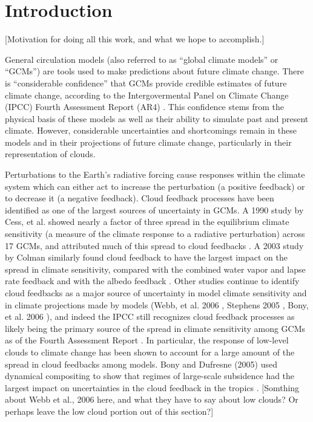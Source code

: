 

%

\chapter{Introduction}
[Motivation for doing all this work, and what we hope to accomplish.]

General circulation models (also referred to as ``global climate models'' or ``GCMs'') are tools used to make predictions about future climate change. There is ``considerable confidence'' that GCMs provide credible estimates of future climate change, according to the Intergovermental Panel on Climate Change (IPCC) Fourth Assessment Report (AR4) \cite{ar4_ch8}. This confidence stems from the physical basis of these models as well as their ability to simulate past and present climate. However, considerable uncertainties and shortcomings remain in these models and in their projections of future climate change, particularly in their representation of clouds.

Perturbations to the Earth's radiative forcing cause responses within the climate system which can either act to increase the perturbation (a positive feedback) or to decrease it (a negative feedback). Cloud feedback processes have been identified as one of the largest sources of uncertainty in GCMs. A 1990 study by Cess, et al. showed nearly a factor of three spread in the equilibrium climate sensitivity (a measure of the climate response to a radiative perturbation) across 17 GCMs, and attributed much of this spread to cloud feedbacks \cite{cess_et_al_1990}. A 2003 study by Colman similarly found cloud feedback to have the largest impact on the spread in climate sensitivity, compared with the combined water vapor and lapse rate feedback and with the albedo feedback \cite{colman_2003}. Other studies continue to identify cloud feedbacks as a major source of uncertainty in model climate sensitivity and in climate projections made by models (Webb, et al. 2006 \cite{webb_et_al_2006}, Stephens 2005 \cite{stephens_2005}, Bony, et al. 2006 \cite{bony_et_al_2006}), and indeed the IPCC still recognizes cloud feedback processes as likely being the primary source of the spread in climate sensitivity among GCMs as of the Fourth Assessment Report \cite{ar4_ch8}. In particular, the response of low-level clouds to climate change has been shown to account for a large amount of the spread in cloud feedbacks among models. Bony and Dufresne (2005) used dynamical compositing to show that regimes of large-scale subsidence had the largest impact on uncertainties in the cloud feedback in the tropics \cite{bony_and_dufresne_2005}. [Somthing about Webb et al., 2006 here, and what they have to say about low clouds? Or perhaps leave the low cloud portion out of this section?] 


